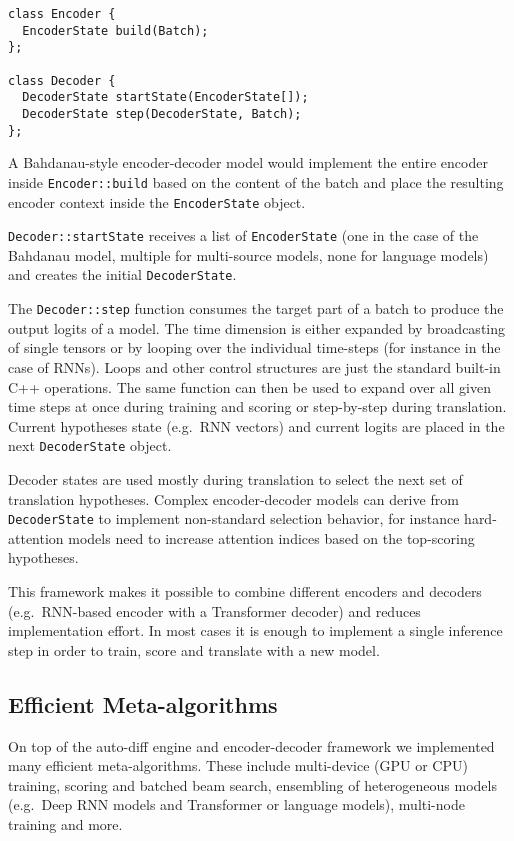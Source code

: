 \documentclass[11pt,a4paper]{article}
\begin{document}
\begin{lstlisting}
class Encoder {
  EncoderState build(Batch);
};

class Decoder {
  DecoderState startState(EncoderState[]);
  DecoderState step(DecoderState, Batch);
};
\end{lstlisting}

A Bahdanau-style encoder-decoder model would implement the entire encoder inside \lstinline|Encoder::build| based on the content of the batch and place the resulting encoder context inside the \lstinline|EncoderState| object. 

\lstinline|Decoder::startState| receives a list of \lstinline|EncoderState| (one in the case of the Bahdanau model, multiple for multi-source models, none for language models) and creates the initial \lstinline|DecoderState|. 

The \lstinline|Decoder::step| function consumes the target part of a batch to produce the output logits of a model. The time dimension is either expanded by broadcasting of single tensors or by looping over the individual time-steps (for instance in the case of RNNs). 
Loops and other control structures are just the standard built-in C++ operations. 
The same function can then be used to expand over all given time steps at once during training and scoring or step-by-step during translation. 
Current hypotheses state (e.g.~RNN vectors) and current logits are placed in the next \lstinline|DecoderState| object. 

Decoder states are used mostly during translation to select the next set of translation hypotheses. Complex encoder-decoder models can derive from \lstinline|DecoderState| to implement non-standard selection behavior, for instance hard-attention models need to increase attention indices based on the top-scoring hypotheses.

This framework makes it possible to combine different encoders and decoders (e.g.~RNN-based encoder with a Transformer decoder) and reduces implementation effort. In most cases it is enough to implement a single inference step in order to train, score and translate with a new model. 

\subsection{Efficient Meta-algorithms}

On top of the auto-diff engine and encoder-decoder framework we implemented many efficient meta-algorithms. These include multi-device (GPU or CPU) training, scoring and batched beam search, ensembling of heterogeneous models (e.g.~Deep RNN models and Transformer or language models), multi-node training and more. 
\end{document}
